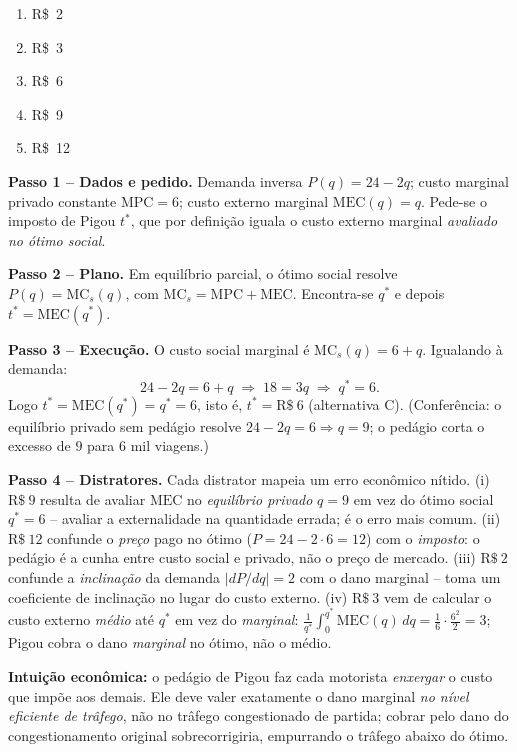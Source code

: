 \begin{enumerate}[label=\Alph*., leftmargin=3.2em, itemsep=0.15em, topsep=0.2em]
  \item R\$~2
  \item R\$~3
  \item R\$~6
  \item R\$~9
  \item R\$~12
\end{enumerate}
\begin{solucao}
\textbf{Passo 1 -- Dados e pedido.} Demanda inversa $P(q)=24-2q$; custo marginal privado constante $\text{MPC}=6$; custo externo marginal $\text{MEC}(q)=q$. Pede-se o imposto de Pigou $t^*$, que por defini\c{c}\~ao iguala o custo externo marginal \emph{avaliado no \'otimo social}.

\textbf{Passo 2 -- Plano.} Em equil\'ibrio parcial, o \'otimo social resolve $P(q)=\text{MC}_s(q)$, com $\text{MC}_s = \text{MPC} + \text{MEC}$. Encontra-se $q^*$ e depois $t^* = \text{MEC}(q^*)$.

\textbf{Passo 3 -- Execu\c{c}\~ao.} O custo social marginal \'e $\text{MC}_s(q) = 6 + q$. Igualando \`a demanda:
\[ 24 - 2q = 6 + q \;\Longrightarrow\; 18 = 3q \;\Longrightarrow\; q^* = 6. \]
Logo $t^* = \text{MEC}(q^*) = q^* = 6$, isto \'e, $t^* = \text{R\$}~6$ (alternativa C). (Confer\^encia: o equil\'ibrio privado sem ped\'agio resolve $24-2q=6\Rightarrow q=9$; o ped\'agio corta o excesso de $9$ para $6$ mil viagens.)

\textbf{Passo 4 -- Distratores.} Cada distrator mapeia um erro econ\^omico n\'itido. (i) $\text{R\$}~9$ resulta de avaliar $\text{MEC}$ no \emph{equil\'ibrio privado} $q=9$ em vez do \'otimo social $q^*=6$ -- avaliar a externalidade na quantidade errada; \'e o erro mais comum. (ii) $\text{R\$}~12$ confunde o \emph{pre\c{c}o} pago no \'otimo ($P=24-2\cdot6=12$) com o \emph{imposto}: o ped\'agio \'e a cunha entre custo social e privado, n\~ao o pre\c{c}o de mercado. (iii) $\text{R\$}~2$ confunde a \emph{inclina\c{c}\~ao} da demanda $|dP/dq|=2$ com o dano marginal -- toma um coeficiente de inclina\c{c}\~ao no lugar do custo externo. (iv) $\text{R\$}~3$ vem de calcular o custo externo \emph{m\'edio} at\'e $q^*$ em vez do \emph{marginal}: $\frac{1}{q^*}\int_0^{q^*}\text{MEC}(q)\,dq = \frac{1}{6}\cdot\frac{6^2}{2}=3$; Pigou cobra o dano \emph{marginal} no \'otimo, n\~ao o m\'edio.

\textbf{Intui\c{c}\~ao econ\^omica:} o ped\'agio de Pigou faz cada motorista \emph{enxergar} o custo que impõe aos demais. Ele deve valer exatamente o dano marginal \emph{no n\'ivel eficiente de tr\^afego}, n\~ao no tr\^afego congestionado de partida; cobrar pelo dano do congestionamento original sobrecorrigiria, empurrando o tr\^afego abaixo do \'otimo.
\end{solucao}

